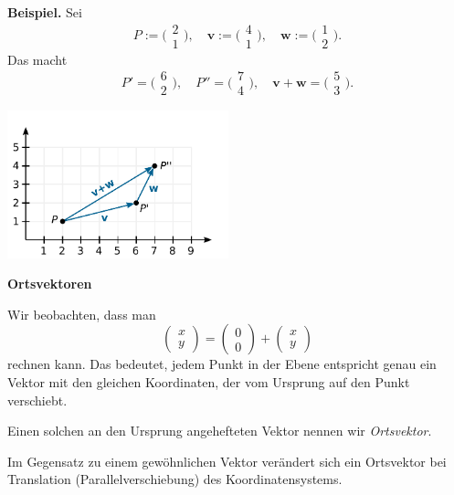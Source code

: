 \documentclass[9pt]{beamer}
\newcommand{\bv}[1]{\mathbf{#1}}
\newcommand{\strong}[1]{\textsf{\textbf{#1}}}
\newcommand{\icol}[1]{
  \big(\!\begin{smallmatrix}#1\end{smallmatrix}\!\big)%
}
\newcommand{\parspace}{\vspace{0.8em}}
\begin{document}
\begin{frame}
\strong{Beispiel.} Sei
\[P:=\icol{2\\ 1},\quad
\bv v := \icol{4\\ 1},\quad \bv w := \icol{1\\ 2}.\]\pause
Das macht
\[P' = \icol{6\\ 2},\quad P'' = \icol{7\\ 4}, \quad\bv v+\bv w = \icol{5\\ 3}.\]

\vspace{-1em}
\begin{center}
\includegraphics[width=64mm]{img/vec-addition.pdf}
\end{center}
\end{frame}

\begin{frame}
\begin{center}
\strong{Ortsvektoren}
\end{center}
\end{frame}

\begin{frame}
Wir beobachten, dass man
\[\begin{pmatrix}x\\ y\end{pmatrix}
= \begin{pmatrix}0\\ 0\end{pmatrix} + \begin{pmatrix}x\\ y\end{pmatrix}\]
rechnen kann. Das bedeutet, jedem Punkt in der Ebene entspricht genau
ein Vektor mit den gleichen Koordinaten, der vom Ursprung auf den Punkt
verschiebt.\pause

\parspace
Einen solchen an den Ursprung angehefteten Vektor nennen wir \emph{Ortsvektor}.\pause

\parspace
Im Gegensatz zu einem gewöhnlichen Vektor verändert sich ein Ortsvektor
bei Translation (Parallelverschiebung) des Koordinatensystems.
\end{frame}
\end{document}

